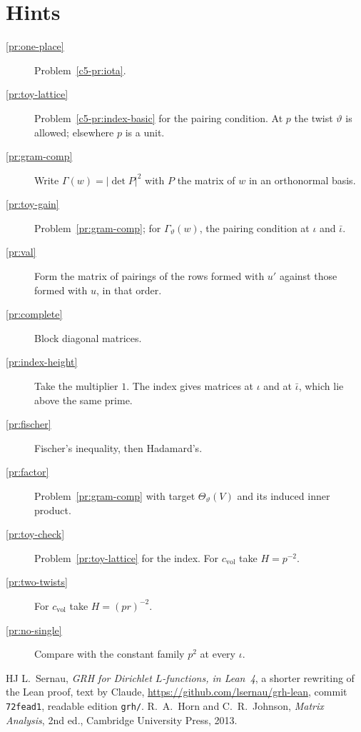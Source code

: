 \documentclass[reqno]{amsart}
\theoremstyle{definition}
\theoremstyle{plain}
\theoremstyle{remark}
\newcommand{\cvol}{c_{\mathrm{vol}}}
\begin{document}
\section*{Hints}
\begin{description}
\item[\ref{pr:one-place}] Problem~\ref{c5-pr:iota}.
\item[\ref{pr:toy-lattice}] Problem~\ref{c5-pr:index-basic} for the pairing condition.  At \(p\) the twist \(\vartheta\) is allowed; elsewhere \(p\) is a unit.
\item[\ref{pr:gram-comp}] Write \(\Gamma(w) = \lvert \det P \rvert^2\) with \(P\) the matrix of \(w\) in an orthonormal basis.
\item[\ref{pr:toy-gain}] Problem~\ref{pr:gram-comp}; for \(\Gamma_\vartheta(w)\), the pairing condition at \(\iota\) and \(\bar\iota\).
\item[\ref{pr:val}] Form the matrix of pairings of the rows formed with \(u'\) against those formed with \(u\), in that order.
\item[\ref{pr:complete}] Block diagonal matrices.
\item[\ref{pr:index-height}] Take the multiplier \(1\).  The index gives matrices at \(\iota\) and at \(\bar\iota\), which lie above the same prime.
\item[\ref{pr:fischer}] Fischer's inequality, then Hadamard's.
\item[\ref{pr:factor}] Problem~\ref{pr:gram-comp} with target \(\Theta_\vartheta(V)\) and its induced inner product.
\item[\ref{pr:toy-check}] Problem~\ref{pr:toy-lattice} for the index.  For \(\cvol\) take \(H = p^{-2}\).
\item[\ref{pr:two-twists}] For \(\cvol\) take \(H = (pr)^{-2}\).
\item[\ref{pr:no-single}] Compare with the constant family \(p^2\) at every \(\iota\).
\end{description}

\begin{thebibliography}{HJ}
 L.~Sernau, \emph{GRH for Dirichlet \(L\)-functions, in Lean~4}, a shorter rewriting of the Lean proof, text by Claude, \url{https://github.com/lsernau/grh-lean}, commit \texttt{72fead1}, readable edition \texttt{grh/}.
 R.~A.~Horn and C.~R.~Johnson, \emph{Matrix Analysis}, 2nd ed., Cambridge University Press, 2013.
\end{thebibliography}
\end{document}
